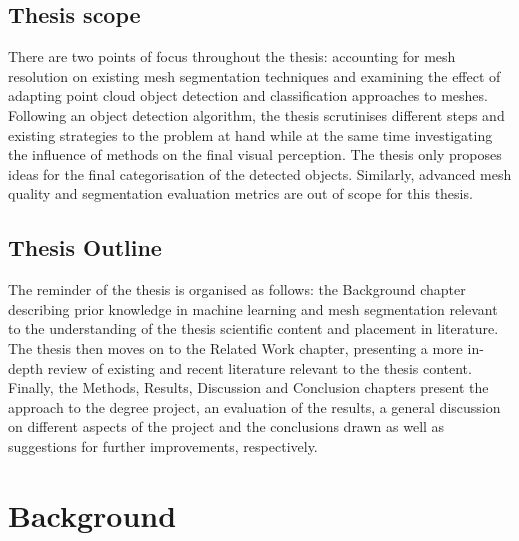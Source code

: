 \documentclass{kththesis}
\begin{document}
\section{Thesis scope}
There are two points of focus throughout the thesis: accounting for mesh resolution on existing mesh segmentation techniques and examining the effect of adapting point cloud object detection and classification approaches to meshes. Following an object detection algorithm, the thesis scrutinises different steps and existing strategies to the problem at hand while at the same time investigating the influence of methods on the final visual perception. The thesis only proposes ideas for the final categorisation of the detected objects. Similarly, advanced mesh quality and segmentation evaluation metrics are out of scope for this thesis. 
\section{Thesis Outline}
The reminder of the thesis is organised as follows: the Background chapter describing prior knowledge in machine learning and mesh segmentation relevant to the understanding of the thesis scientific content and placement in literature. The thesis then moves on to the Related Work chapter, presenting a more in-depth review of existing and recent literature relevant to the thesis content. Finally, the Methods, Results, Discussion and Conclusion chapters present the approach to the degree project, an evaluation of the results, a general discussion on different aspects of the project and the conclusions drawn as well as suggestions for further improvements, respectively. 

\chapter{Background}
\end{document}

